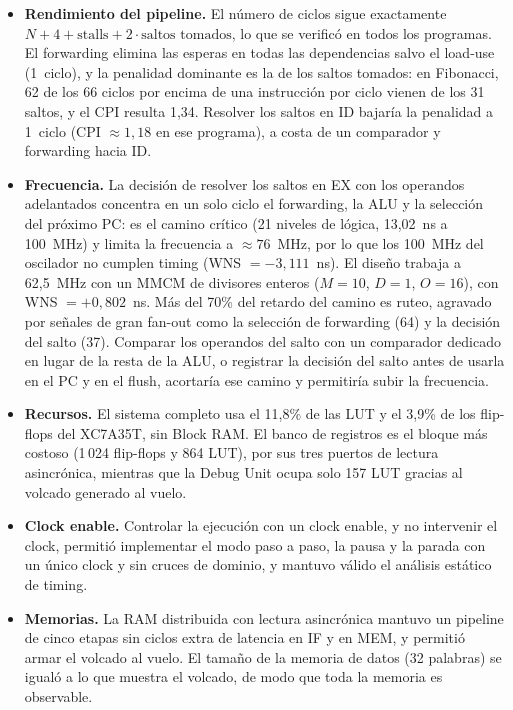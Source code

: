 \documentclass[12pt,a4paper]{article}
\begin{document}
\begin{itemize}
  \item \textbf{Rendimiento del pipeline.} El número de ciclos sigue exactamente
  $N + 4 + \text{stalls} + 2 \cdot \text{saltos tomados}$, lo que se verificó en
  todos los programas. El forwarding elimina las esperas en todas las
  dependencias salvo el load-use (1~ciclo), y la penalidad dominante es la de
  los saltos tomados: en Fibonacci, 62 de los 66 ciclos por encima de una
  instrucción por ciclo vienen de los 31 saltos, y el CPI resulta 1,34. Resolver
  los saltos en ID bajaría la penalidad a 1~ciclo (CPI $\approx 1{,}18$ en ese
  programa), a costa de un comparador y forwarding hacia ID.

  \item \textbf{Frecuencia.} La decisión de resolver los saltos en EX con los
  operandos adelantados concentra en un solo ciclo el forwarding, la ALU y la
  selección del próximo PC: es el camino crítico (21 niveles de lógica,
  13,02~ns a 100~MHz) y limita la frecuencia a $\approx 76$~MHz, por lo que
  los 100~MHz del oscilador no cumplen timing (WNS $= -3{,}111$~ns). El diseño
  trabaja a 62,5~MHz con un MMCM de divisores enteros ($M = 10$, $D = 1$,
  $O = 16$), con WNS $= +0{,}802$~ns. Más del 70\% del retardo del camino es
  ruteo, agravado por señales de gran fan-out como la selección de forwarding
  (64) y la decisión del salto (37). Comparar los operandos del salto con un
  comparador dedicado en lugar de la resta de la ALU, o registrar la decisión
  del salto antes de usarla en el PC y en el flush, acortaría ese camino y
  permitiría subir la frecuencia.

  \item \textbf{Recursos.} El sistema completo usa el 11,8\% de las LUT y el
  3,9\% de los flip-flops del XC7A35T, sin Block RAM. El banco de registros es
  el bloque más costoso (1\,024 flip-flops y 864 LUT), por sus tres puertos de
  lectura asincrónica, mientras que la Debug Unit ocupa solo 157 LUT gracias al
  volcado generado al vuelo.

  \item \textbf{Clock enable.} Controlar la ejecución con un clock enable, y no
  intervenir el clock, permitió implementar el modo paso a paso, la pausa y la
  parada con un único clock y sin cruces de dominio, y mantuvo válido el
  análisis estático de timing.

  \item \textbf{Memorias.} La RAM distribuida con lectura asincrónica mantuvo un
  pipeline de cinco etapas sin ciclos extra de latencia en IF y en MEM, y
  permitió armar el volcado al vuelo. El tamaño de la memoria de datos (32
  palabras) se igualó a lo que muestra el volcado, de modo que toda la memoria
  es observable.


\end{itemize}
\end{document}
